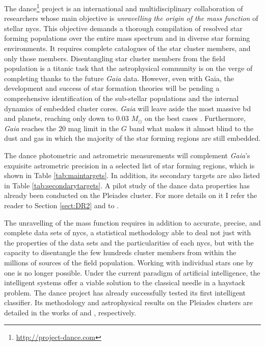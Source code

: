 The \gls{dance}\footnote{\url{http://project-dance.com}} project is an international and multidisciplinary collaboration of researchers whose main objective is \textsl{unravelling the origin of the mass function} of stellar \glspl{nyc}. This objective demands a thorough compilation of resolved star forming populations over the entire mass spectrum and in diverse star forming environments. It requires complete catalogues of the star cluster members, and only those members. Disentangling star cluster members from the field population is a titanic task that the astrophysical community is on the verge of completing thanks to the future \emph{Gaia} \citep{GAIA} data. However, even with Gaia, the development and success of star formation theories will be pending a comprehensive identification of the sub-stellar populations and the internal dynamics of embedded cluster cores. \emph{Gaia} will leave aside the most massive \gls{bd} and planets, reaching only down to 0.03 $M_{\odot}$ on the best cases \citep{Sarro2013}. Furthermore, \emph{Gaia} reaches the 20 mag limit in the $G$ band \cite[350 nm to 1000 nm][]{2010A&A...523A..48J} what makes it almost blind to the dust and gas in which the majority of the star forming regions are still embedded. 

The \gls{dance} photometric and astrometric measurements will complement \emph{Gaia}'s exquisite astrometric precision in a selected list of star forming regions, which is shown in Table \ref{tab:maintargets}. In addition, its secondary targets are also listed in Table \ref{tab:secondarytargets}. A pilot study of the \gls{dance} data properties has already been conducted on the Pleiades cluster. For more details on it I refer the reader to Section \ref{sect:DR2} and to \citet{Bouy2013}.




The unravelling of the mass function requires in addition to accurate, precise, and complete data sets of \glspl{nyc}, a statistical methodology able to deal not just with the properties of the data sets and the particularities of each \glspl{nyc}, but with the capacity to disentangle the few hundreds cluster members from within the millions of sources of the field population. Working with individual stars one by one is no longer possible. Under the current paradigm of artificial intelligence, the intelligent systems offer a viable solution to the classical needle in a haystack problem. The \gls{dance} project has already successfully tested its first intelligent classifier. Its methodology and astrophysical results on the Pleiades clusters are detailed in the works of \citet{Sarro2014} and \citet{Bouy2015}, respectively. 

